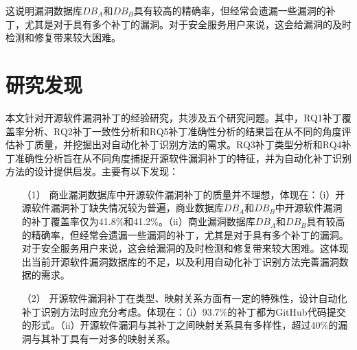 这说明漏洞数据库$DB_A$和$DB_B$具有较高的精确率，但经常会遗漏一些漏洞的补丁，尤其是对于具有多个补丁的漏洞。对于安全服务用户来说，这会给漏洞的及时检测和修复带来较大困难。%

\section{研究发现}
本文针对开源软件漏洞补丁的经验研究，共涉及五个研究问题。其中，RQ1补丁覆盖率分析、RQ2补丁一致性分析和RQ5补丁准确性分析的结果旨在从不同的角度评估补丁质量，并挖掘出对自动化补丁识别方法的需求。RQ3补丁类型分析和RQ4补丁准确性分析旨在从不同角度捕捉开源软件漏洞补丁的特征，并为自动化补丁识别方法的设计提供启发。主要有以下发现：

\begin{enumerate}
    \item [（1）]商业漏洞数据库中开源软件漏洞补丁的质量并不理想，体现在：（i）开源软件漏洞补丁缺失情况较为普遍，商业数据库$DB_A$和$DB_B$中开源软件漏洞的补丁覆盖率仅为41.8\%和41.2\%。（ii）商业漏洞数据库$DB_A$和$DB_B$具有较高的精确率，但经常会遗漏一些漏洞的补丁，尤其是对于具有多个补丁的漏洞。对于安全服务用户来说，这会给漏洞的及时检测和修复带来较大困难。这体现出当前开源软件漏洞数据库的不足，以及利用自动化补丁识别方法完善漏洞数据的需求。
    \item [（2）]开源软件漏洞补丁在类型、映射关系方面有一定的特殊性，设计自动化补丁识别方法时应充分考虑。体现在：（i）93.7\%的补丁都为GitHub代码提交的形式。（ii）开源软件漏洞与其补丁之间映射关系具有多样性，超过40\%的漏洞与其补丁具有一对多的映射关系。
\end{enumerate}

